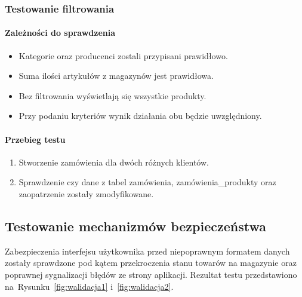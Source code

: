 \documentclass[a4paper, 12pt]{article}
\newcommand{\snippet}[3]{



}
\begin{document}
\subsubsection{Testowanie filtrowania}
\paragraph{Zależności do sprawdzenia}
\begin{itemize}
\item Kategorie oraz producenci zostali przypisani prawidłowo.
\item Suma ilości artykułów z magazynów jest prawidłowa.
\item Bez filtrowania wyświetlają się wszystkie produkty.
\item Przy podaniu kryteriów wynik działania obu będzie uwzględniony.
\end{itemize}
\paragraph{Przebieg testu}
\begin{enumerate}
\item Stworzenie zamówienia dla dwóch różnych klientów.
\item Sprawdzenie czy dane z tabel zamówienia, zamówienia\_produkty oraz zaopatrzenie zostały zmodyfikowane.
\end{enumerate}

\snippet{Java}{testZamowienia.java}{Fragment przykładowego testu}

\subsection{Testowanie mechanizmów bezpieczeństwa}
Zabezpieczenia interfejsu użytkownika przed niepoprawnym formatem danych zostały sprawdzone pod kątem przekroczenia stanu towarów na magazynie oraz poprawnej sygnalizacji błędów ze strony aplikacji. Rezultat testu przedstawiono na~Rysunku~\ref{fig:walidacja1} i~\ref{fig:walidacja2}.
\end{document}
